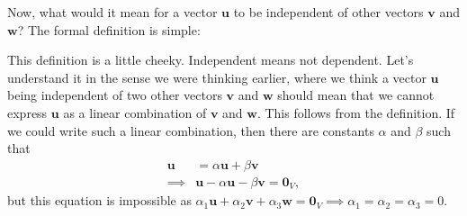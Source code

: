 Now, what would it mean for a vector $\mathbf{u}$ to be independent of other vectors $\mathbf{v}$ and $\mathbf{w}$? The formal definition is simple:


\noindent This definition is a little cheeky. Independent means not dependent. Let's understand it in the sense we were thinking earlier, where we think a vector $\mathbf{u}$ being independent of two other vectors $\mathbf{v}$ and $\mathbf{w}$ should mean that we cannot express $\mathbf{u}$ as a linear combination of $\mathbf{v}$ and $\mathbf{w}$. This follows from the definition. If we could write such a linear combination, then there are constants $\alpha$ and $\beta$ such that
\begin{align*}
\mathbf{u} &= \alpha \mathbf{u} + \beta \mathbf{v} \\
\implies & \mathbf{u}- \alpha \mathbf{u} - \beta \mathbf{v} = \mathbf{0}_V,
\end{align*}
but this equation is impossible as $\alpha_1 \mathbf{u} + \alpha_2 \mathbf{v} + \alpha_3 \mathbf{w} =  \mathbf{0}_V \implies \alpha_1=\alpha_2=\alpha_3=0$. \\


